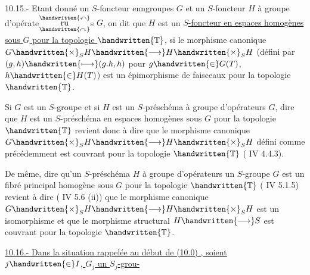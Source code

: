  10.15.- Etant donné un $S$-foncteur enngroupes $G$ et un $S$-foncteur $H$ à groupe d'opérate$\overset{\handwritten{\curvearrowleft}}{\underset{\handwritten{\curvearrowright}}{\mathrm{ru}}}$s $G$, on dit que $H$ est un \uline{$S$-foncteur en espaces homogènes sous $G$ pour la topologie $\handwritten{\mathbb{T}}$}, si le morphisme canonique $G\handwritten{\times}_S H\handwritten{\longrightarrow}H\handwritten{\times}_S H$ (défini par $(g,h)\handwritten{\longmapsto}(g.h,h)$ pour $g\handwritten{\in}G(T)$, $h\handwritten{\in}H(T)$) est un épimorphisme de faisceaux pour la topologie $\handwritten{\mathbb{T}}$.

Si $G$ est un $S$-groupe et si $H$ est un $S$-préschéma à  groupe d'opérateurs $G$, dire que $H$ est un $S$-préschéma en espaces homogènes sous $G$ pour la topologie $\handwritten{\mathbb{T}}$ revient donc à dire que le morphisme canonique $G\handwritten{\times}_S H\handwritten{\longrightarrow}H\handwritten{\times}_S H$ défini comme précédemment est couvrant pour la topologie $\handwritten{\mathbb{T}}$ ( IV 4.4.3).

De même, dire qu'un $S$-préschéma $H$ à groupe d'opérateurs un $S$-groupe $G$ est un fibré principal homogène sous $G$ pour la topologie $\handwritten{\mathbb{T}}$ ( IV 5.1.5) revient à dire ( IV 5.6 (ii)) que le morphisme canonique $G\handwritten{\times}_S H\handwritten{\longrightarrow}H\handwritten{\times}_S H$ est un isomorphisme et que le morphisme structural $H\handwritten{\longrightarrow}S$ est couvrant pour la topologie $\handwritten{\mathbb{T}}$.

\uline{10.16.- Dans la situation rappelée au début de (10.0) , soient $j\handwritten{\in}I$, $G_j$ un $S_j$-grou-}
